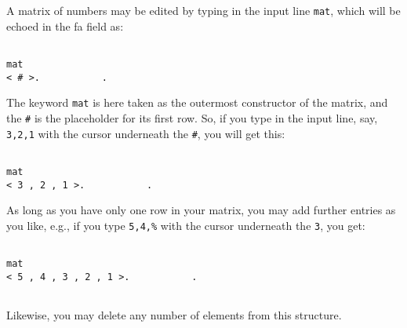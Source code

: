  A matrix of numbers may be edited by typing in the input line
{\tt mat}, which will be echoed in the {\sc fa} field as:
\begin{verbatim}

mat 
< # >.           .

\end{verbatim}
The keyword {\tt mat} is here taken as the outermost constructor of the matrix, and the {\tt \#} is the placeholder for its first
row. So, if you type in the input line, say, {\tt 3,2,1} with
the cursor underneath the {\tt \#}, you will get this:
\begin{verbatim}

mat 
< 3 , 2 , 1 >.           .

\end{verbatim}
As long as you have only one row in your matrix, you may
add further entries as you like, e.g., if you type {\tt 5,4,\%}
with the cursor underneath the {\tt 3}, you get:
\begin{verbatim}

mat 
< 5 , 4 , 3 , 2 , 1 >.           .
 
\end{verbatim}
Likewise, you may delete any number of elements from this
structure. 

